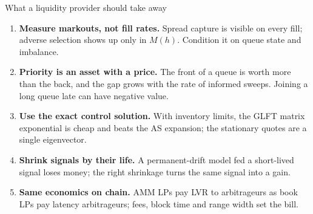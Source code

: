 \begin{frame}{What a liquidity provider should take away}
  \small
  \begin{enumerate}
    \item \textbf{Measure markouts, not fill rates.} Spread capture is visible on every fill; adverse selection shows up only in $M(h)$. Condition it on queue state and imbalance.
    \item \textbf{Priority is an asset with a price.} The front of a queue is worth more than the back, and the gap grows with the rate of informed sweeps. Joining a long queue late can have negative value.
    \item \textbf{Use the exact control solution.} With inventory limits, the GLFT matrix exponential is cheap and beats the AS expansion; the stationary quotes are a single eigenvector.
    \item \textbf{Shrink signals by their life.} A permanent-drift model fed a short-lived signal loses money; the right shrinkage turns the same signal into a gain.
    \item \textbf{Same economics on chain.} AMM LPs pay LVR to arbitrageurs as book LPs pay latency arbitrageurs; fees, block time and range width set the bill.
  \end{enumerate}
\end{frame}
